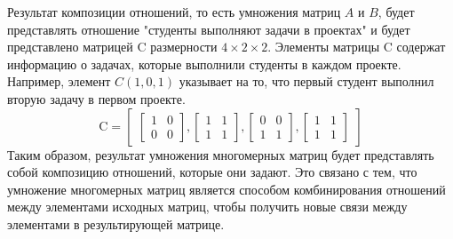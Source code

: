 \documentclass{article}
\begin{document}
Результат композиции отношений, то есть умножения матриц $A$ и $B$, будет представлять отношение "студенты выполняют задачи в проектах" и будет представлено матрицей C размерности $4 \times 2 \times 2$. Элементы матрицы C содержат информацию о задачах, которые выполнили студенты в каждом проекте. Например, элемент $C(1, 0, 1)$ указывает на то, что первый студент выполнил вторую задачу в первом проекте.
\[
\text{C} = \begin{bmatrix}
      \begin{bmatrix}
        1 & 0 \\
        0 & 0
      \end{bmatrix}, 
      \begin{bmatrix} 
        1 & 1 \\
        1 & 1
      \end{bmatrix},
      \begin{bmatrix}
        0 & 0 \\
        1 & 1
      \end{bmatrix}, 
      \begin{bmatrix}
        1 & 1 \\
        1 & 1
      \end{bmatrix}
\end{bmatrix}
\] 
Таким образом, результат умножения многомерных матриц будет представлять собой композицию отношений, которые они задают. Это связано с тем, что умножение многомерных матриц является способом комбинирования отношений между элементами исходных матриц, чтобы получить новые связи между элементами в результирующей матрице.
\end{document}
